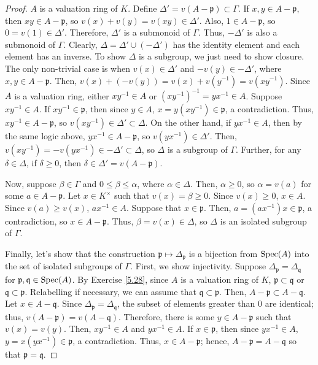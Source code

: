 \begin{proof}
$A$ is a valuation ring of $K$. Define $\Delta' = v(A-\mathfrak{p}) \subset \Gamma$. If $x,y \in A-\mathfrak{p}$, then $xy \in A - \mathfrak{p}$, so 
$v(x) + v(y) = v(xy) \in \Delta'$. Also, $1 \in A-\mathfrak{p}$, so $0 = v(1) \in \Delta'$. Therefore, $\Delta'$ is a submonoid of $\Gamma$. Thus,
$-\Delta'$ is also a submonoid of $\Gamma$. Clearly, $\Delta = \Delta' \cup (-\Delta')$ has the identity element and each element has an inverse. To show
$\Delta$ is a subgroup, we just need to show closure. The only non-trivial case is when $v(x) \in \Delta'$ and $-v(y) \in -\Delta'$, where $x,y \in A - \mathfrak{p}$.
Then, $v(x) + (-v(y)) = v(x) + v(y^{-1}) = v(xy^{-1})$. Since $A$ is a valuation ring, either $xy^{-1} \in A$ or $(xy^{-1})^{-1} = yx^{-1} \in A$. Suppose $xy^{-1} \in A$.
If $xy^{-1} \in \mathfrak{p}$, then since $y \in A$, $x = y(xy^{-1}) \in \mathfrak{p}$, a contradiction. Thus, $xy^{-1} \in A - \mathfrak{p}$, so $v(xy^{-1}) \in \Delta' \subset \Delta$.
On the other hand, if $yx^{-1} \in A$, then by the same logic above, $yx^{-1} \in A - \mathfrak{p}$, so $v(yx^{-1}) \in \Delta'$. Then, $v(xy^{-1}) = -v(yx^{-1}) \in -\Delta' \subset \Delta$,
so $\Delta$ is a subgroup of $\Gamma$. Further, for any $\delta \in \Delta$, if $\delta \ge 0$, then $\delta \in \Delta' = v(A - \mathfrak{p})$.

Now, suppose $\beta \in \Gamma$ and $0 \le \beta \le \alpha$, where $\alpha \in \Delta$. Then, $\alpha \ge 0$, so $\alpha = v(a)$ for some $a \in A - \mathfrak{p}$. 
Let $x \in K^{\times}$ such that $v(x) = \beta \ge 0$. Since $v(x) \ge 0$, $x \in A$. Since $v(a) \ge v(x)$, $ax^{-1} \in A$. Suppose that $x \in \mathfrak{p}$. Then,
$a = (ax^{-1})x \in \mathfrak{p}$, a contradiction, so $x \in A - \mathfrak{p}$. Thus, $\beta = v(x) \in \Delta$, so $\Delta$ is an isolated subgroup of $\Gamma$.

Finally, let's show that the construction $\mathfrak{p} \mapsto \Delta_{\mathfrak{p}}$ is a bijection from $\operatorname{Spec}(A)$ into the set of isolated subgroups of $\Gamma$. First,
we show injectivity. Suppose $\Delta_{\mathfrak{p}} = \Delta_{\mathfrak{q}}$ for $\mathfrak{p},\mathfrak{q} \in \operatorname{Spec}(A)$. By Exercise \ref{5.28}, since $A$ is a valuation
ring of $K$, $\mathfrak{p} \subset \mathfrak{q}$ or $\mathfrak{q} \subset \mathfrak{p}$. Relabelling if necessary, we can assume that $\mathfrak{q} \subset \mathfrak{p}$. Then,
$A - \mathfrak{p} \subset A - \mathfrak{q}$. Let $x \in A - \mathfrak{q}$. Since $\Delta_{\mathfrak{p}} = \Delta_{\mathfrak{q}}$, the subset of elements greater than $0$ are identical;
thus, $v(A - \mathfrak{p}) = v(A - \mathfrak{q})$. Therefore, there is some $y \in A-\mathfrak{p}$ such that $v(x) = v(y)$. Then, $xy^{-1} \in A$ and $yx^{-1} \in A$. If $x \in \mathfrak{p}$,
then since $yx^{-1} \in A$, $y = x(yx^{-1}) \in \mathfrak{p}$, a contradiction. Thus, $x \in A - \mathfrak{p}$; hence, $A - \mathfrak{p} = A - \mathfrak{q}$ so that $\mathfrak{p} = \mathfrak{q}$.


\end{proof}
